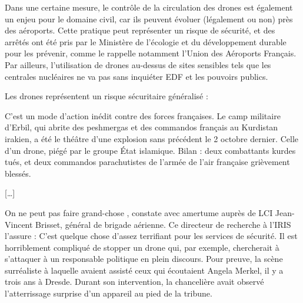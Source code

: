 	
	Dans une certaine mesure, le contrôle de la circulation des drones est également un enjeu pour le domaine civil, car ils peuvent évoluer (légalement ou non) près des aéroports. Cette pratique peut représenter un risque de sécurité, et des arrêtés ont été pris par le Ministère de l'écologie et du développement durable pour les prévenir, comme le rappelle notamment l'Union des Aéroports Français\footnotemark. Par ailleurs, l'utilisation de drones au-dessus de sites sensibles tels que les centrales nucléaires ne va pas sans inquiéter EDF et les pouvoirs publics\footnotemark.
	
	\addtocounter{footnote}{-1}
	
	\addtocounter{footnote}{1}


	Les drones représentent un risque sécuritaire généralisé :
	
	\begin{displayquote}
	C'est un mode d'action inédit contre des forces françaises. Le camp militaire d'Erbil, qui abrite des peshmergas et des commandos français au Kurdistan irakien, a été le théâtre d'une explosion sans précédent le 2 octobre dernier. Celle d'un drone, piégé par le groupe État islamique. Bilan : deux combattants kurdes tués, et deux commandos parachutistes de l'armée de l'air française grièvement blessés.
	
	[\ldots{}]
	
	\og On ne peut pas faire grand-chose \fg{}, constate avec amertume auprès de LCI Jean-Vincent Brisset, général de brigade aérienne. Ce directeur de recherche à l'IRIS l'assure : \og C'est quelque chose d'assez terrifiant pour les services de sécurité. Il est horriblement compliqué de stopper un drone qui, par exemple, chercherait à s'attaquer à un responsable politique en plein discours. \fg{} Pour preuve, la scène surréaliste à laquelle avaient assisté ceux qui écoutaient Angela Merkel, il y a trois ans à Dresde. Durant son intervention, la chancelière avait observé l'atterrissage surprise d'un appareil au pied de la tribune\footnotemark.	
	\end{displayquote}
	
